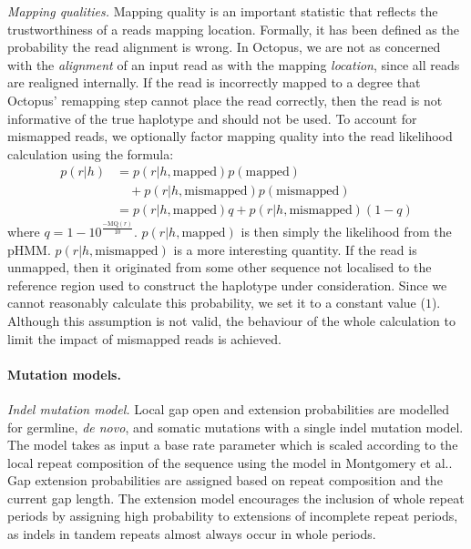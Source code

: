 \documentclass[notitlepage, twocolumn, 10pt]{article}
\begin{document}
\vspace{3mm}
\noindent\emph{Mapping qualities.} Mapping quality is an important statistic that reflects the trustworthiness of a reads mapping location. Formally, it has been defined as the probability the read alignment is wrong. In Octopus, we are not as concerned with the \emph{alignment} of an input read as with the mapping \emph{location}, since all reads are realigned internally. If the read is incorrectly mapped to a degree that Octopus' remapping step cannot place the read correctly, then the read is not informative of the true haplotype and should not be used. To account for mismapped reads, we optionally factor mapping quality into the read likelihood calculation using the formula:
\begin{align*}
	p(r | h) &= p(r | h, \text{mapped})p(\text{mapped}) \\
              & \quad + p(r | h, \text{mismapped})p(\text{mismapped})\\
	         &= p(r | h, \text{mapped})q + p(r | h, \text{mismapped})(1 - q)
\end{align*}
where $q = 1 - 10^{\frac{-\text{MQ}(r)}{10}}$. $p(r | h, \text{mapped})$ is then simply the likelihood from the pHMM. $p(r | h, \text{mismapped})$ is a more interesting quantity. If the read is unmapped, then it originated from some other sequence not localised to the reference region used to construct the haplotype under consideration. Since we cannot reasonably calculate this probability, we set it to a constant value ($1$). Although this assumption is not valid, the behaviour of the whole calculation to limit the impact of mismapped reads is achieved.

\paragraph*{Mutation models.} \emph{Indel mutation model.} Local gap open and extension probabilities are modelled for germline, \textit{de novo}, and somatic mutations with a single indel mutation model. The model takes as input a base rate parameter which is scaled according to the local repeat composition of the sequence using the model in Montgomery et al.\cite{RN577}. Gap extension probabilities are assigned based on repeat composition and the current gap length. The extension model encourages the inclusion of whole repeat periods by assigning high probability to extensions of incomplete
repeat periods, as indels in tandem repeats almost always occur in whole periods.
\end{document}
